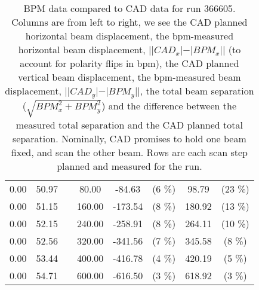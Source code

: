 \begin{table}
\begin{tabular}{c c c c c c c c}
0.00 & 50.97 &  & 80.00 & -84.63 &  (6 \%) & 98.79 &  (23 \%)\\
0.00 & 51.15 &  & 160.00 & -173.54 &  (8 \%) & 180.92 &  (13 \%)\\
0.00 & 52.15 &  & 240.00 & -258.91 &  (8 \%) & 264.11 &  (10 \%)\\
0.00 & 52.56 &  & 320.00 & -341.56 &  (7 \%) & 345.58 &  (8 \%)\\
0.00 & 53.44 &  & 400.00 & -416.78 &  (4 \%) & 420.19 &  (5 \%)\\
0.00 & 54.71 &  & 600.00 & -616.50 &  (3 \%) & 618.92 &  (3 \%)\\
\bottomrule
\end{tabular}
\caption{ BPM data compared to CAD data for run 366605. Columns are from left to right, we see the CAD planned horizontal beam displacement, the bpm-measured horizontal beam displacement, $||CAD_{x}| - |BPM_{x}||$ (to account for polarity flips in bpm), the CAD planned vertical beam displacement, the bpm-measured beam displacement, $||CAD_{y}| - |BPM_{y}||$, the total beam separation ($\sqrt{BPM_{x}^2+BPM_{y}^2}$) and the difference between the measured total separation and the CAD planned total separation. Nominally, CAD promises to hold one beam fixed, and scan the other beam. Rows are each scan step planned and measured for the run. }
\end{table}


